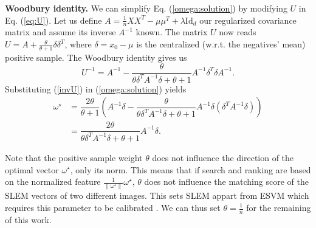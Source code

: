 \textbf{Woodbury identity.} 
We can simplify Eq. (\ref{omega:solution}) by modifying $U$ in Eq. (\ref{eq:U}).
Let us define $A = \frac{1}{n}XX^T-\mu\mu^T +\lambda\mathrm{Id}_d$ our regularized covariance matrix and assume its inverse $A^{-1}$ known. 
The matrix $U$ now reads $U = A + \frac{\theta}{\theta+1}\delta\delta^T$, where $\delta=x_0-\mu$ is the centralized (w.r.t. the negatives' mean) positive sample. The Woodbury identity \cite{woodbury} gives us
\begin{equation}
U^{-1} = A^{-1} -\dfrac{\theta}{\theta\delta^TA^{-1}\delta+ \theta+1}A^{-1}\delta^T\delta A^{-1}. \label{invU}
\end{equation}
Substituting (\ref{invU}) in (\ref{omega:solution}) yields
\begin{equation}
\begin{split}
\omega^\star &= \dfrac{2\theta}{\theta +1}\left(A^{-1}\delta - \dfrac{\theta}{\theta\delta^TA^{-1}\delta+ \theta+1} A^{-1}\delta (\delta^TA^{-1}\delta)\right)\\
&= \dfrac{2\theta}{\theta\delta^TA^{-1}\delta+ \theta+1} A^{-1}\delta.\label{Wood:omega}
\end{split}
\end{equation}

Note that the positive sample weight $\theta$ does not influence the direction of the optimal vector $\omega^\star$, only its norm. This means that if search and ranking are based on the normalized feature $\frac{1}{\|\omega^\star\|}\omega^\star$, $\theta$ does not influence the matching score of the SLEM vectors of two different images. This sets SLEM appart from ESVM which requires this parameter to be calibrated \cite{Efros11,ZePe15}. We can thus set $\theta=\frac{1}{n}$ for the remaining of this work.

